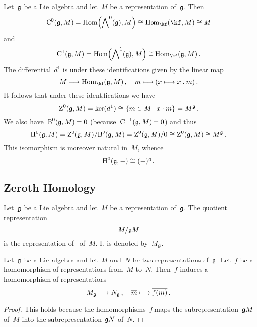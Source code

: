 \begin{fluff}
	\label{zeroth cohomology}
	Let~$\mathfrak{g}$ be a Lie~algebra and let~$M$ be a representation of~$\mathfrak{g}$.
	Then
	\[
		\Chain^0(\glie, M)
		=
		\Hom\Bigl( \Exterior^0(\glie), M \Bigr)
		\cong
		\Hom_{\kf}( \kf, M )
		\cong
		M
	\]
	and
	\[
		\Chain^1(\glie, M)
		=
		\Hom\Bigl( \Exterior^1(\glie), M \Bigr)
		\cong
		\Hom_{\kf}( \glie, M ) \,.
	\]
	The differential~$d^1$ is under these identifications given by the linear map
	\[
		M
		\to
		\Hom_{\kf}(\glie, M) \,,
		\quad
		m
		\mapsto
		( x \mapsto x \act m ) \,.
	\]
	It follows that under these identifications we have
	\[
		\Cycle^0(\glie, M)
		=
		\ker(d^1)
		\cong
		\{
			m \in M
		\suchthat
			x \cdot m
		\}
		=
		M^{\glie} \,.
	\]
	We also have~$\operatorname{B}^0(\mathfrak{g}, M) = 0$ (because~$\operatorname{C}^{-1}(\mathfrak{g}, M) = 0$) and thus
	\[
		\operatorname{H}^0(\mathfrak{g}, M)
		=
		\operatorname{Z}^0(\mathfrak{g}, M) / { \operatorname{B}^0(\mathfrak{g}, M) }
		=
		\operatorname{Z}^0(\mathfrak{g}, M) / 0
		\cong
		\operatorname{Z}^0(\mathfrak{g}, M)
		\cong
		M^{\mathfrak{g}} \,.
	\]
	This isomorphism is moreover natural in~$M$, whence
	\[
		\Homology^0(\glie, \ph)
		\cong
		(\ph)^{\glie} \,.
		\index{invariants}
	\]
\end{fluff}



\subsection{Zeroth Homology}

\begin{definition}
	Let~$\mathfrak{g}$ be a Lie~algebra and let~$M$ be a representation of~$\mathfrak{g}$.
	The quotient representation
	\[
		M / \mathfrak{g} M
	\]
	is the representation of~ of~$M$.
	It is denoted by~$M_{\mathfrak{g}}$.
\end{definition}


\begin{proposition}
	\label{functoriality of coinvariants}
	Let~$\mathfrak{g}$ be a Lie~algebra and let~$M$ and~$N$ be two representations of~$\mathfrak{g}$.
	Let~$f$ be a homomorphism of representations from~$M$ to~$N$.
	Then~$f$ induces a homomorphism of representations
	\[
		M_{\glie}
		\to
		N_{\glie} \,,
		\quad
		\class{m}
		\mapsto
		\class{f(m)} \,.
	\]
\end{proposition}


\begin{proof}
	This holds because the homomorphisms~$f$ maps the subrepresentation~$\mathfrak{g} M$ of~$M$ into the subrepresentation~$\mathfrak{g} N$ of~$N$.
\end{proof}



